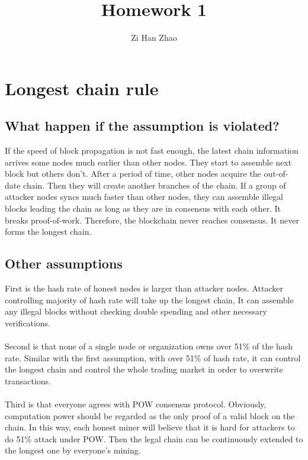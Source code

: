 \documentclass{article}
\author{Zi Han Zhao}
\affil{1001103708}
\title{Homework 1}
\date{}
\begin{document}
\maketitle
\section{Longest chain rule}
\renewcommand{\thesubsection}{(\alph{subsection})}
\subsection{What happen if the assumption is violated?}
If the speed of block propagation is not fast enough, the latest chain information arrives some nodes much earlier than other nodes. They start to assemble next block but others don't. After a period of time, other nodes acquire the out-of-date chain. Then they will create another branches of the chain. If a group of attacker nodes syncs much faster than other nodes, they can assemble illegal blocks leading the chain as long as they are in consensus with each other. It breaks proof-of-work. Therefore, the blockchain never reaches consensus. It never forms the longest chain.
\subsection{Other assumptions}
First is the hash rate of honest nodes is larger than attacker nodes. Attacker controlling majority of hash rate will take up the longest chain, It can assemble any illegal blocks without checking double spending and other necessary verifications.\\\\
Second is that none of a single node or organization owns over 51\% of the hash rate. Similar with the first assumption, with over 51\% of hash rate, it can control the longest chain and control the whole trading market in order to overwrite transactions.\\\\
Third is that everyone agrees with POW consensus protocol. Obviously, computation power should be regarded as the only proof of a valid block on the chain. In this way, each honest miner will believe that it is hard for attackers to do 51\% attack under POW. Then the legal chain can be continuously extended to the longest one by everyone's mining.
\end{document}
